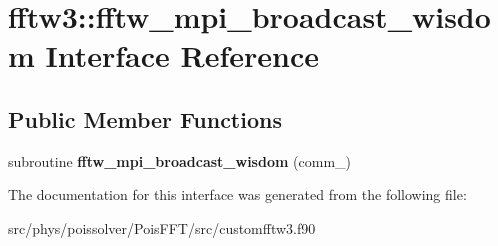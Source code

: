 \hypertarget{interfacefftw3_1_1fftw__mpi__broadcast__wisdom}{}\section{fftw3\+:\+:fftw\+\_\+mpi\+\_\+broadcast\+\_\+wisdom Interface Reference}
\label{interfacefftw3_1_1fftw__mpi__broadcast__wisdom}
\subsection*{Public Member Functions}
\begin{DoxyCompactItemize}
\item 
subroutine {\bfseries fftw\+\_\+mpi\+\_\+broadcast\+\_\+wisdom} (comm\+\_\+)\hypertarget{interfacefftw3_1_1fftw__mpi__broadcast__wisdom_ab4ed705b7f67bd7d2dfc47794e0247df}{}\label{interfacefftw3_1_1fftw__mpi__broadcast__wisdom_ab4ed705b7f67bd7d2dfc47794e0247df}

\end{DoxyCompactItemize}


The documentation for this interface was generated from the following file\+:\begin{DoxyCompactItemize}
\item 
src/phys/poissolver/\+Pois\+F\+F\+T/src/customfftw3.\+f90\end{DoxyCompactItemize}

